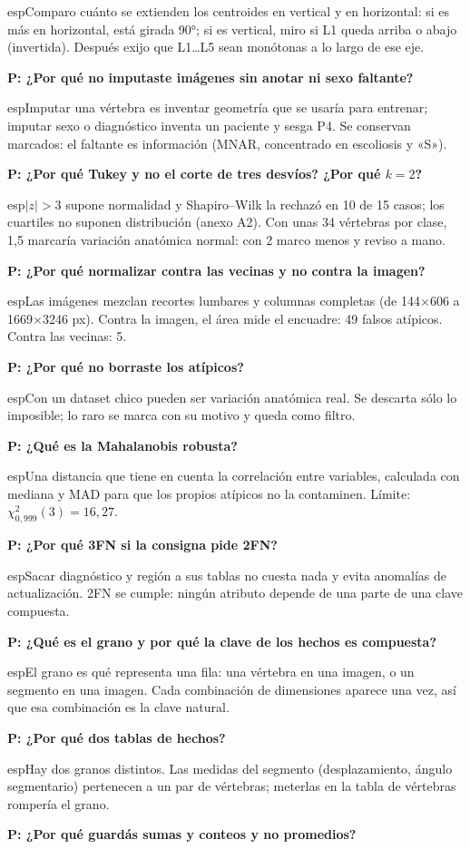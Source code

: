 \documentclass[11pt,a4paper]{article}
\newcommand{\preg}[1]{\par\medskip\textbf{P: #1}\par\nopagebreak}
\begin{document}
esp{Comparo cuánto se extienden los centroides en vertical y en horizontal: si es más en horizontal, está girada 90°; si es vertical, miro si L1 queda arriba o abajo (invertida). Después exijo que L1\dots L5 sean monótonas a lo largo de ese eje.}
\preg{¿Por qué no imputaste imágenes sin anotar ni sexo faltante?}

esp{Imputar una vértebra es inventar geometría que se usaría para entrenar; imputar sexo o diagnóstico inventa un paciente y sesga P4. Se conservan marcados: el faltante es información (MNAR, concentrado en escoliosis y «S»).}
\preg{¿Por qué Tukey y no el corte de tres desvíos? ¿Por qué $k=2$?}

esp{$|z|>3$ supone normalidad y Shapiro--Wilk la rechazó en 10 de 15 casos; los cuartiles no suponen distribución (anexo A2). Con unas 34 vértebras por clase, 1,5 marcaría variación anatómica normal: con 2 marco menos y reviso a mano.}
\preg{¿Por qué normalizar contra las vecinas y no contra la imagen?}

esp{Las imágenes mezclan recortes lumbares y columnas completas (de 144$\times$606 a 1669$\times$3246 px). Contra la imagen, el área mide el encuadre: 49 falsos atípicos. Contra las vecinas: 5.}
\preg{¿Por qué no borraste los atípicos?}

esp{Con un dataset chico pueden ser variación anatómica real. Se descarta sólo lo imposible; lo raro se marca con su motivo y queda como filtro.}
\preg{¿Qué es la Mahalanobis robusta?}

esp{Una distancia que tiene en cuenta la correlación entre variables, calculada con mediana y MAD para que los propios atípicos no la contaminen. Límite: $\chi^2_{0{,}999}(3)=16{,}27$.}
\preg{¿Por qué 3FN si la consigna pide 2FN?}

esp{Sacar diagnóstico y región a sus tablas no cuesta nada y evita anomalías de actualización. 2FN se cumple: ningún atributo depende de una parte de una clave compuesta.}
\preg{¿Qué es el grano y por qué la clave de los hechos es compuesta?}

esp{El grano es qué representa una fila: una vértebra en una imagen, o un segmento en una imagen. Cada combinación de dimensiones aparece una vez, así que esa combinación es la clave natural.}
\preg{¿Por qué dos tablas de hechos?}

esp{Hay dos granos distintos. Las medidas del segmento (desplazamiento, ángulo segmentario) pertenecen a un par de vértebras; meterlas en la tabla de vértebras rompería el grano.}
\preg{¿Por qué guardás sumas y conteos y no promedios?}
\end{document}
